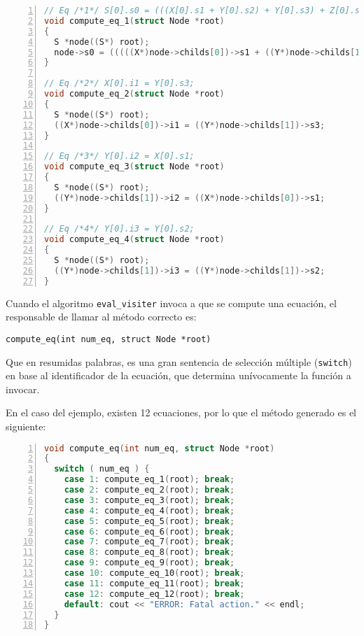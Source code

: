 \vspace*{0.2cm}
\begin{lstlisting}[language=C++, basicstyle=\scriptsize, numbers=left, columns=fullflexible]
// Eq /*1*/ S[0].s0 = (((X[0].s1 + Y[0].s2) + Y[0].s3) + Z[0].s4);
void compute_eq_1(struct Node *root)
{
  S *node((S*) root);
  node->s0 = (((((X*)node->childs[0])->s1 + ((Y*)node->childs[1])->s2) + ((Y*)node->childs[1])->s3) + ((Z*)node->childs[2])->s4);
}

// Eq /*2*/ X[0].i1 = Y[0].s3;
void compute_eq_2(struct Node *root)
{
  S *node((S*) root);
  ((X*)node->childs[0])->i1 = ((Y*)node->childs[1])->s3;
}

// Eq /*3*/ Y[0].i2 = X[0].s1;
void compute_eq_3(struct Node *root)
{
  S *node((S*) root);
  ((Y*)node->childs[1])->i2 = ((X*)node->childs[0])->s1;
}

// Eq /*4*/ Y[0].i3 = Y[0].s2;
void compute_eq_4(struct Node *root)
{
  S *node((S*) root);
  ((Y*)node->childs[1])->i3 = ((Y*)node->childs[1])->s2;
}
\end{lstlisting}
\vspace*{0.2cm}

Cuando el algoritmo \texttt{eval\_visiter} invoca a que se compute una ecuación, el responsable de llamar al método correcto es:

\begin{center}\texttt{compute\_eq(int num\_eq, struct Node *root)}\end{center}

Que en resumidas palabras, es una gran sentencia de selección múltiple (\texttt{switch}) en base al identificador de la ecuación, que determina unívocamente la función a invocar.

En el caso del ejemplo, existen 12 ecuaciones, por lo que el método generado es el siguiente:

\vspace*{0.2cm}
\begin{lstlisting}[language=C++, basicstyle=\scriptsize, numbers=left, columns=fullflexible]
void compute_eq(int num_eq, struct Node *root)
{
  switch ( num_eq ) {
    case 1: compute_eq_1(root); break;
    case 2: compute_eq_2(root); break;
    case 3: compute_eq_3(root); break;
    case 4: compute_eq_4(root); break;
    case 5: compute_eq_5(root); break;
    case 6: compute_eq_6(root); break;
    case 7: compute_eq_7(root); break;
    case 8: compute_eq_8(root); break;
    case 9: compute_eq_9(root); break;
    case 10: compute_eq_10(root); break;
    case 11: compute_eq_11(root); break;
    case 12: compute_eq_12(root); break;
    default: cout << "ERROR: Fatal action." << endl;
  }
}
\end{lstlisting}
\vspace*{0.2cm}

\normalsize
